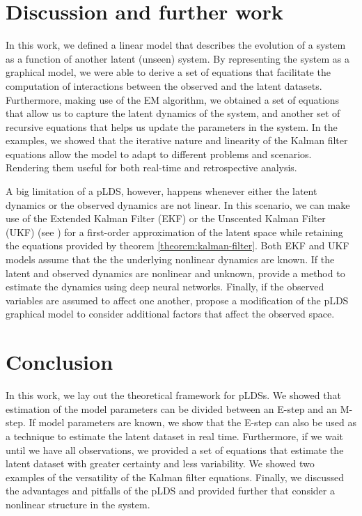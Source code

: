 \documentclass[11pt]{article}
\numberwithin{equation}{section}
\begin{document}
\section{Discussion and further work}
In this work, we defined a linear model that describes the evolution of a system as a function of another latent (unseen) system. By representing the system as a graphical model, we were able to derive a set of equations that facilitate the computation of interactions between the observed and the latent datasets. Furthermore, making use of the EM algorithm, we obtained a set of equations that allow us to capture the latent dynamics of the system, and another set of recursive equations that helps us update the parameters in the system. In the examples, we showed that the iterative nature and linearity of the Kalman filter equations allow the model to adapt to different problems and scenarios. Rendering them useful for both real-time and retrospective analysis.

A big limitation of a pLDS, however, happens whenever either the latent dynamics or the observed dynamics are not linear. In this scenario, we can make use of the Extended Kalman Filter (EKF) or the Unscented Kalman Filter (UKF) (see \cite{pml2Book}) for a first-order approximation of the latent space while retaining the equations provided by theorem \ref{theorem:kalman-filter}. Both EKF and UKF models assume that the the underlying nonlinear dynamics are known. If the latent and observed dynamics are nonlinear and unknown, \cite{krishnan2015deep} provide a method to estimate the  dynamics using deep neural networks. Finally, if the observed variables are assumed to affect one another, \cite{deeprl} propose a modification of the pLDS graphical model to consider additional factors that affect the observed space.

\section{Conclusion}
In this work, we lay out the theoretical framework for pLDSs. We showed that estimation of the model parameters can be divided between an E-step and an M-step. If model parameters are known, we show that the E-step can also be used as a technique to estimate the latent dataset in real time. Furthermore, if we wait until we have all observations, we provided a set of equations that estimate the latent dataset with greater certainty and less variability. We showed two examples of the versatility of the Kalman filter equations. Finally, we discussed the advantages and pitfalls of the pLDS and provided further that consider a nonlinear structure in the system.
\end{document}
